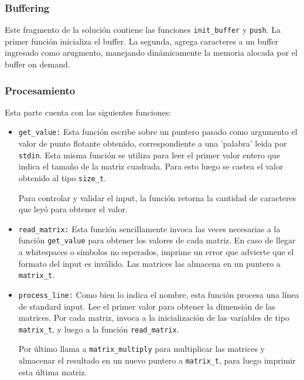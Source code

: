 \documentclass[a4paper,10pt, spanish]{article}
\begin{document}
\subsubsection{Buffering}

Este fragmento de la solución contiene las funciones \lstinline{init_buffer} y \lstinline{push}. La primer función inicializa el buffer. 
La segunda, agrega caracteres a un buffer ingresado como arugmento, manejando dinámicamente la memoria alocada por el buffer on demand.

\subsubsection{Procesamiento}

Esta parte cuenta con las siguientes funciones: 

\begin{itemize}
  \item \lstinline{get_value:} Esta función escribe sobre un puntero pasado como argumento el valor de punto flotante obtenido, correspondiente a una 'palabra' leida por \lstinline{stdin}. 
  Esta misma función se utiliza para leer el primer valor entero que indica el tamaño de la matriz cuadrada. Para esto luego se castea el valor obtenido al tipo \lstinline{size_t}.
  
  Para controlar y validar el input, la función retorna la cantidad de caracteres que leyó para obtener el valor.
	\item \lstinline{read_matrix:} Esta función sencillamente invoca las veces necesarias a la función \lstinline{get_value} para obtener los valores de cada matriz.
  En caso de llegar a whitespaces o símbolos no esperados, imprime un error que advierte que el formato del input es inválido. Las matrices las almacena en un puntero a \lstinline{matrix_t}.

  \item \lstinline{process_line:} Como bien lo indica el nombre, esta función procesa una línea de standard input. Lee el primer valor para obtener la dimensión de las matrices. 
  Por cada matriz, invoca a la inicialización de las variables de tipo \lstinline{matrix_t}, y luego a la función \lstinline{read_matrix}.
  
  Por último llama a \lstinline{matrix_multiply} para multiplicar las matrices y almacenar el resultado en un nuevo puntero a \lstinline{matrix_t}, para luego imprimir esta última matriz.
\end{itemize}
\end{document}
